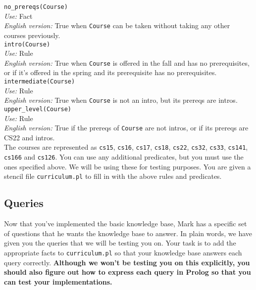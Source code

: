 \documentclass{article}
\begin{document}
\verb|no_prereqs(Course)|\\
\textit{Use:} Fact\\
\textit{English version:} True when \verb|Course| can be taken without taking any other courses previously. \\

\verb|intro(Course)|\\
\textit{Use:} Rule\\
\textit{English version:} True when \verb|Course| is offered in the fall and has no prerequisites, or if it's offered in the spring and its prerequisite has no prerequisites. \\

\verb|intermediate(Course)|\\
\textit{Use:} Rule\\
\textit{English version:} True when \verb|Course| is not an intro, but its prereqs are intros. \\

\verb|upper_level(Course)|\\
\textit{Use:} Rule\\
\textit{English version:}  True if the prereqs of \verb|Course| are not intros, or if its prereqs are CS22 and intros.\\

The courses are represented as \verb|cs15|, \verb|cs16|, \verb|cs17|, \verb|cs18|, \verb|cs22|, \verb|cs32|, \verb|cs33|, \verb|cs141|, \verb|cs166| and \verb|cs126|. You can use any additional predicates, but you must use the ones specified above. We will be using these for testing purposes.
You are given a stencil file \verb|curriculum.pl| to fill in with the above rules and predicates.


\subsection{Queries}

Now that you've implemented the basic knowledge base, Mark has a specific set of questions that he wants the knowledge base to answer. In plain words, we have given you the queries that we will be testing you on. Your task is to add the appropriate facts to \verb|curriculum.pl| so that your knowledge base answers each query correctly. \textbf{Although we won't be testing you on this explicitly, you should also figure out how to express each query in Prolog so that you can test your implementations.}\\
\end{document}
